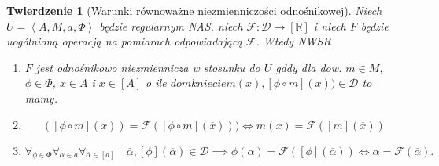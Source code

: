 \documentclass[12pt,a4paper]{report}
\newtheorem{tw}[definition]{Twierdzenie}
\newcommand{\domkniecie}[1]{\left\lbrack{#1}\right\rbrack}
\newcommand{\tuple}[1]{\left\langle {#1} \right\rangle}
\begin{document}
\begin{tw}[Warunki równoważne niezmienniczości odnośnikowej]
Niech $U=\tuple{A,M,a,\Phi}$ będzie regularnym NAS, niech $\mathcal{F}:\mathcal{D}\to \domkniecie{\mathbb{R}}$ i niech $F$ będzie uogólnioną operacją na pomiarach odpowiadającą $\mathcal{F}$. Wtedy
NWSR
\begin{enumerate}
\item
$F$ jest odnośnikowo niezmiennicza w stosunku do $U$ gddy dla dow. $m \in M$, $\phi \in \Phi$, $ x \in A$ i $\overline{x} \in \domkniecie{A}$ o ile $domkniecie{m}(\overline{x}), \domkniecie{\phi\circ m}(\overline{x})) \in \mathcal{D}$ to mamy.
\item
$$
(\domkniecie{\phi\circ m}(x))=\mathcal{F}( \domkniecie{\phi \circ m}(\overline{x}))) \iff m(x)=\mathcal{F}(\domkniecie{m}(\overline{x}))
$$
\item
$$
\forall_{\phi \in \Phi}\forall_{\alpha \in a}\forall_{\overline{\alpha} \in \domkniecie{a}} \quad \overline{\alpha}, \domkniecie{\phi}(\overline{\alpha}) \in \mathcal{D} \implies \phi(\alpha)=\mathcal{F}(\domkniecie{\phi}(\overline{\alpha})) \iff \alpha=\mathcal{F}(\overline{\alpha}).
$$
\end{enumerate}

\end{tw}
\end{document}
